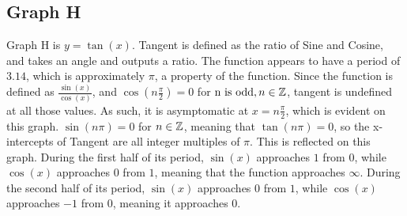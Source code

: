 \subsection{Graph H}

Graph H is $y=\tan(x)$.
Tangent is defined as the ratio of Sine and Cosine, and takes an angle and outputs a ratio.
The function appears to have a period of $3.14$, which is approximately $\pi$, a property of the function.
Since the function is defined as $\frac{\sin(x)}{\cos(x)}$, and ${\cos(n{\frac{\pi}{2}})=0}$ for ${\text{n is odd}, n\in \mathbb{Z}}$, tangent is undefined at all those values.
As such, it is asymptomatic at $x={n{\frac{\pi}{2}}}$, which is evident on this graph.
${\sin(n\pi)=0}$ for ${n \in \mathbb{Z}}$, meaning that ${\tan(n{\pi})=0}$, so the x-intercepts of Tangent are all integer multiples of ${\pi}$.
This is reflected on this graph.
During the first half of its period, ${\sin(x)}$ approaches $1$ from $0$, while ${\cos(x)}$ approaches $0$ from $1$, meaning that the function approaches $\infty$.
During the second half of its period, ${\sin(x)}$ approaches $0$ from $1$, while ${\cos(x)}$ approaches $-1$ from $0$, meaning it approaches $0$.
